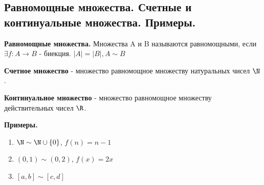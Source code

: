\subsection{Равномощные множества. Счетные и континуальные множества. Примеры.}
\textbf{Равномощные множества.} Множества A и B называются равномощными, если $\exists f : A \to B$ - биекция. $|A| = |B|, A \sim B$

\textbf{Счетное множество} - множество равномощное множеству натуральных чисел $\N$.

\textbf{Континуальное множество} - множество равномощное множеству действительных чисел $\R$.

\textbf{Примеры.}

\begin{enumerate}
    \item $\N \sim \N \cup \{0\}$, $f(n) = n - 1$
    \item $(0, 1) \sim (0, 2)$,  $f(x) = 2x$
    \item $[a, b] \sim [c, d]$
\end{enumerate}